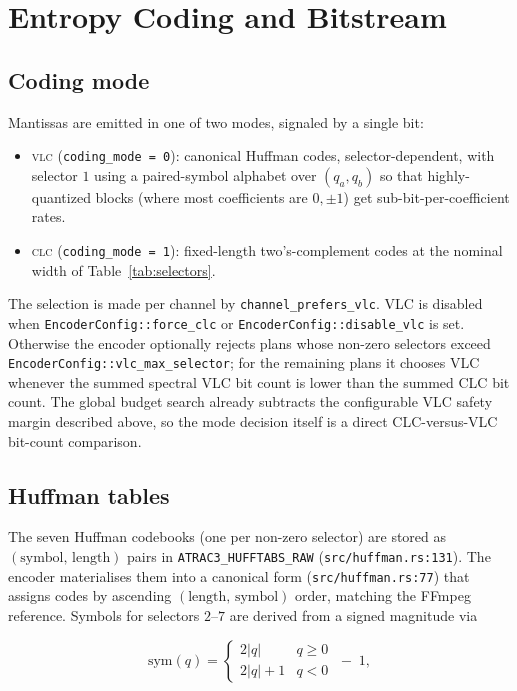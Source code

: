 \documentclass[11pt]{article}
\begin{document}
\section{Entropy Coding and Bitstream}
\label{sec:entropy}

\subsection{Coding mode}

Mantissas are emitted in one of two modes, signaled by a single bit:

\begin{itemize}
\itemsep0pt
\item \textsc{vlc} (\texttt{coding\_mode = 0}): canonical Huffman codes,
selector-dependent, with selector \(1\) using a paired-symbol alphabet over
\((q_a, q_b)\) so that highly-quantized blocks (where most coefficients are
\(0, \pm 1\)) get sub-bit-per-coefficient rates.
\item \textsc{clc} (\texttt{coding\_mode = 1}): fixed-length two's-complement
codes at the nominal width of Table~\ref{tab:selectors}.
\end{itemize}

The selection is made per channel by
\texttt{channel\_prefers\_vlc}. VLC is disabled when
\texttt{EncoderConfig::force\_clc} or \texttt{EncoderConfig::disable\_vlc} is set. Otherwise
the encoder optionally rejects plans whose non-zero selectors exceed
\texttt{EncoderConfig::vlc\_max\_selector}; for the remaining plans it chooses VLC
whenever the summed spectral VLC bit count is lower than the summed CLC bit
count. The global budget search already subtracts the configurable VLC safety
margin described above, so the mode decision itself is a direct CLC-versus-VLC
bit-count comparison.

\subsection{Huffman tables}

The seven Huffman codebooks (one per non-zero selector) are stored as
\((\text{symbol},\,\text{length})\) pairs in
\texttt{ATRAC3\_HUFFTABS\_RAW} (\texttt{src/huffman.rs:131}). The encoder
materialises them into a canonical form
(\texttt{src/huffman.rs:77}) that assigns codes by ascending
\((\text{length},\,\text{symbol})\) order, matching the FFmpeg reference.
Symbols for selectors \(2\)--\(7\) are derived from a signed magnitude via

\begin{equation}
    \text{sym}(q) = \begin{cases}
        2|q|       & q \geq 0 \\
        2|q| + 1   & q < 0
    \end{cases}\;-\;1,
    \label{eq:scalar_vlc}
\end{equation}
\end{document}
